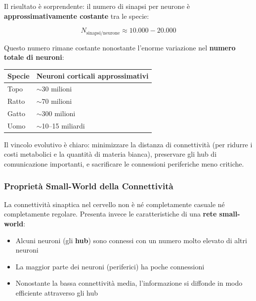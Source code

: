 Il risultato è sorprendente: il numero di sinapsi per neurone è \textbf{approssimativamente costante} tra le specie:

$$ N_{\text{sinapsi/neurone}} \approx 10.000 - 20.000 $$

Questo numero rimane costante nonostante l'enorme variazione nel \textbf{numero totale di neuroni}:

\begin{table}[htbp]
    \centering
    \renewcommand{\arraystretch}{1.3}
    \begin{tabularx}{\textwidth}{|l|X|}
    \hline
    \textbf{Specie} & \textbf{Neuroni corticali approssimativi} \\
    \hline
    Topo & $\sim$30 milioni \\
    Ratto & $\sim$70 milioni \\
    Gatto & $\sim$300 milioni \\
    Uomo & $\sim$10–15 miliardi \\
    \hline
    \end{tabularx}
\end{table}

\begin{tcolorbox}[colback=gray!5, colframe=gray!40, arc=2mm, boxrule=0.5pt]
Il vincolo evolutivo è chiaro: minimizzare la distanza di connettività (per ridurre i costi metabolici e la quantità di materia bianca), preservare gli hub di comunicazione importanti, e sacrificare le connessioni periferiche meno critiche.
\end{tcolorbox}

\subsubsection{Proprietà Small-World della Connettività}

La connettività sinaptica nel cervello non è né completamente casuale né completamente regolare. Presenta invece le caratteristiche di una \textbf{rete small-world}:

\begin{itemize}
    \item Alcuni neuroni (gli \textbf{hub}) sono connessi con un numero molto elevato di altri neuroni
    \item La maggior parte dei neuroni (periferici) ha poche connessioni
    \item Nonostante la bassa connettività media, l'informazione si diffonde in modo efficiente attraverso gli hub
\end{itemize}

